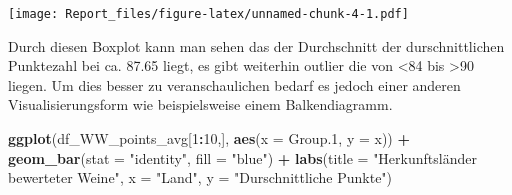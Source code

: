 \documentclass[
]{article}
\newenvironment{Shaded}{\begin{snugshade}}{\end{snugshade}}
\newcommand{\AttributeTok}[1]{\textcolor[rgb]{0.13,0.29,0.53}{#1}}
\newcommand{\CommentTok}[1]{\textcolor[rgb]{0.56,0.35,0.01}{\textit{#1}}}
\newcommand{\DecValTok}[1]{\textcolor[rgb]{0.00,0.00,0.81}{#1}}
\newcommand{\FloatTok}[1]{\textcolor[rgb]{0.00,0.00,0.81}{#1}}
\newcommand{\FunctionTok}[1]{\textcolor[rgb]{0.13,0.29,0.53}{\textbf{#1}}}
\newcommand{\NormalTok}[1]{#1}
\newcommand{\OtherTok}[1]{\textcolor[rgb]{0.56,0.35,0.01}{#1}}
\newcommand{\SpecialCharTok}[1]{\textcolor[rgb]{0.81,0.36,0.00}{\textbf{#1}}}
\newcommand{\StringTok}[1]{\textcolor[rgb]{0.31,0.60,0.02}{#1}}
\begin{document}
\begin{Shaded}
\end{Shaded}

\texttt{[image: Report\_files/figure-latex/unnamed-chunk-4-1.pdf]}

Durch diesen Boxplot kann man sehen das der Durchschnitt der
durschnittlichen Punktezahl bei ca. 87.65 liegt, es gibt weiterhin
outlier die von \textless84 bis \textgreater90 liegen. Um dies besser zu
veranschaulichen bedarf es jedoch einer anderen Visualisierungsform wie
beispielsweise einem Balkendiagramm.

\begin{Shaded}
\begin{Highlighting}[]
\FunctionTok{ggplot}\NormalTok{(df\_WW\_points\_avg[}\DecValTok{1}\SpecialCharTok{:}\DecValTok{10}\NormalTok{,], }\FunctionTok{aes}\NormalTok{(}\AttributeTok{x =}\NormalTok{ Group}\FloatTok{.1}\NormalTok{, }\AttributeTok{y =}\NormalTok{ x)) }\SpecialCharTok{+}
  \FunctionTok{geom\_bar}\NormalTok{(}\AttributeTok{stat =} \StringTok{"identity"}\NormalTok{, }\AttributeTok{fill =} \StringTok{"blue"}\NormalTok{) }\SpecialCharTok{+}
  \FunctionTok{labs}\NormalTok{(}\AttributeTok{title =} \StringTok{"Herkunftsländer bewerteter Weine"}\NormalTok{, }\AttributeTok{x =} \StringTok{"Land"}\NormalTok{, }\AttributeTok{y =} \StringTok{"Durschnittliche Punkte"}\NormalTok{)}
\end{Highlighting}
\end{Shaded}
\end{document}
